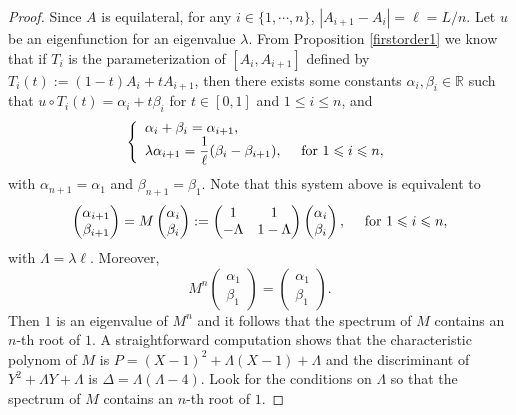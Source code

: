 \documentclass[12pt,english]{smfart} %
\theoremstyle{remark}
\newcommand{\R}{\mathbb{R}}
\begin{document}
\begin{proof} Since $A$ is equilateral, for any $i\in\{1,\cdots,n\}$, $|A_{i+1}-A_i|=\ell=L/n$. Let $u$ be an eigenfunction for an eigenvalue $\lambda$. From Proposition \ref{firstorder1} we know that if  $T_i$ is the parameterization of $[A_i,A_{i+1}]$ defined by $T_i(t) := (1-t)A_i + tA_{i+1}$, then there exists some constants $\alpha_i,\beta_i \in \R$ such that $u\circ T_i(t)=\alpha_i +t \beta_i$ for $t\in[0,1]$ and $ 1\leqslant i \leqslant n$, and 
$$
\left\{
 \begin{array}{ll}
\alpha_i+\beta_i=\alpha_{i+1},\\
\lambda\alpha_{i+1}=\dfrac{1}{\ell}(\beta_i-\beta_{i+1}), \quad \textnormal{ for } 1\leqslant i  \leqslant n,
 \end{array}
  \right. 
 $$
with $\alpha_{n+1}=\alpha_1$ and $\beta_{n+1}=\beta_1$. Note that this system above is equivalent to
\begin{equation}\label{equivalence-system}
 \begin{pmatrix}
\alpha_{i+1}\\\beta_{i+1}
\end{pmatrix}=M\begin{pmatrix}
\alpha_i\\\beta_i
\end{pmatrix}:=\begin{pmatrix}
1&1\\-\Lambda&1-\Lambda
\end{pmatrix}\begin{pmatrix}
\alpha_i\\\beta_i
\end{pmatrix},\quad \textnormal{ for }1\leqslant i  \leqslant n,
\end{equation}
with $\Lambda = \lambda \ell$. Moreover, $$M^n\begin{pmatrix}
\alpha_1\\\beta_1
\end{pmatrix}=\begin{pmatrix}
\alpha_1\\\beta_1
\end{pmatrix}.$$ Then $1$ is an eigenvalue of $M^n$ and it follows that the spectrum of $M$ contains an $n$-th root of $1$. A straightforward computation shows that the characteristic polynom of $M$ is $P=(X-1)^2+\Lambda(X-1)+\Lambda$ and the discriminant of $Y^2+\Lambda Y+\Lambda$ is $\Delta=\Lambda(\Lambda-4)$. Look for the conditions on $\Lambda$ so that the spectrum of $M$ contains an $n$-th root of $1$. 


\end{proof}
\end{document}
